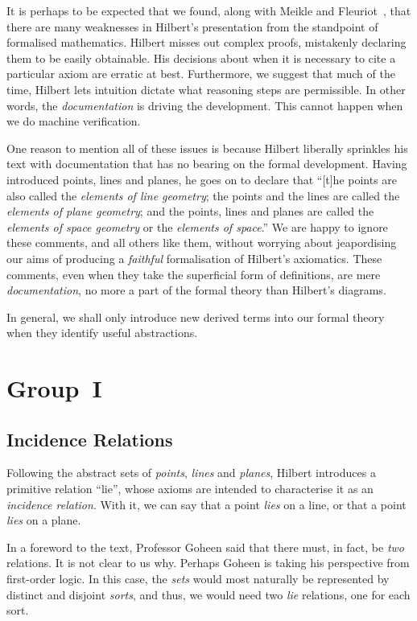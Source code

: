 It is perhaps to be expected that we found, along with Meikle and Fleuriot~\cite{MeikleFleuriotFormalizingHilbert}, that there are many weaknesses in Hilbert's presentation from the standpoint of formalised mathematics. Hilbert misses out complex proofs, mistakenly declaring them to be easily obtainable. His decisions about when it is necessary to cite a particular axiom are erratic at best. Furthermore, we suggest that much of the time, Hilbert lets intuition dictate what reasoning steps are permissible. In other words, the \emph{documentation} is driving the development. This cannot happen when we do machine verification.

One reason to mention all of these issues is because Hilbert liberally sprinkles his text with documentation that has no bearing on the formal development. Having introduced points, lines and planes, he goes on to declare that ``[t]he points are also called the \emph{elements of line geometry}; the points and the lines are called the \emph{elements of plane geometry}; and the points, lines and planes are called the \emph{elements of space geometry} or the \emph{elements of space}.'' We are happy to ignore these comments, and all others like them, without worrying about jeapordising our aims of producing a \emph{faithful} formalisation of Hilbert's axiomatics. These comments, even when they take the superficial form of definitions, are mere \emph{documentation}, no more a part of the formal theory than Hilbert's diagrams. 

In general, we shall only introduce new derived terms into our formal theory when they identify useful abstractions.

\section{Group~I}
\subsection{Incidence Relations}
Following the abstract sets of \emph{points}, \emph{lines} and \emph{planes}, Hilbert introduces a primitive  relation ``lie'', whose axioms are intended to characterise it as an \emph{incidence relation}. With it, we can say that a point \emph{lies} on a line, or that a point \emph{lies} on a plane. 

In a foreword to the text, Professor Goheen said that there must, in fact, be \emph{two} relations. It is not clear to us why. Perhaps Goheen is taking his perspective from first-order logic. In this case, the \emph{sets} would most naturally be represented by distinct and disjoint \emph{sorts}, and thus, we would need two \emph{lie} relations, one for each sort. 

